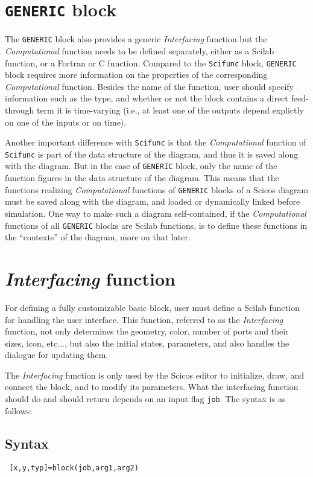 \documentclass{book}
\newcommand{\computational}{{\em Computational }}
\newcommand{\interfacing}{{\em Interfacing }}
\begin{document}



\section{{\tt GENERIC} block}
The {\tt GENERIC} block also provides a generic \interfacing function
but the \computational function needs to be defined separately,
either as a Scilab function, or a Fortran or C function. 
Compared to the {\tt Scifunc} block, {\tt GENERIC} block requires
more information on the properties of the corresponding \computational
function. Besides the name of the function, user should specify
information such as the type, and whether or not the block contains a
direct feed-through term it is time-varying (i.e., at least one of the
outputs depend explictly on one of the inputs or on time). 

Another important difference with {\tt Scifunc} is that the
\computational function of {\tt Scifunc} is part of the data structure
of the diagram, and thus it is saved along with the diagram. But in
the case of {\tt GENERIC} block, only the name of the function
figures in the data structure of the diagram. This means that the
functions realizing \computational functions of {\tt GENERIC} blocks
of a Scicos diagram must be saved along with the diagram, and loaded or
dynamically linked before simulation. One way to make such a diagram
self-contained, if the \computational functions of all {\tt GENERIC}
blocks are Scilab functions, is to define these functions in the
``contexts'' of the diagram, more on that later.

\section{\interfacing function}
For defining a fully customizable basic block, user must define a Scilab  
function for handling the user interface. This function, referred to as
the \interfacing function, not only determines the geometry, color, number
of ports and their sizes, icon, etc..., but also the initial states,
parameters, and also handles the dialogue for updating them.

The \interfacing function is only used by the
Scicos editor to initialize, draw, and connect the block, and to modify
its parameters. What the interfacing function should do and should return depends on
an input flag {\tt job}. The syntax is as follows:

\subsection{Syntax}
\begin{verbatim}
 [x,y,typ]=block(job,arg1,arg2)
\end{verbatim}
\end{document}
